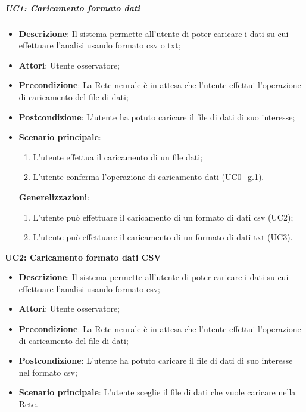 \subparagraph{UC1: Caricamento formato dati}\mbox{}
\label{UC1: Caricamento formato dati}
\noindent
\begin{itemize}
\item \textbf{Descrizione}: Il sistema permette all'utente di poter caricare i dati su cui effettuare l'analisi usando formato csv o txt;
\item \textbf{Attori}: Utente osservatore;
\item \textbf{Precondizione}: La Rete neurale \`e in attesa che l'utente effettui l'operazione di caricamento del file di dati;
\item \textbf{Postcondizione}: L'utente ha potuto caricare il file di dati di suo interesse;
\item \textbf{Scenario principale}:
\begin{enumerate}
\item L'utente effettua il caricamento di un file dati;
\item L'utente conferma l'operazione di caricamento dati (UC0\_g.1).
\end{enumerate}
\textbf{Generelizzazioni}:
\begin{enumerate}
\item L'utente pu\`o effettuare il caricamento di un formato di dati csv (UC2);
\item L'utente pu\`o effettuare il caricamento di un formato di dati txt (UC3).
\end{enumerate}
\end{itemize}


\textbf{UC2: Caricamento formato dati CSV}\mbox{}
\label{UC2: Caricamento formato dati CSV}
\begin{itemize}
\item \textbf{Descrizione}: Il sistema permette all'utente di poter caricare i dati su cui effettuare l'analisi usando formato csv;
\item \textbf{Attori}: Utente osservatore;
\item \textbf{Precondizione}: La Rete neurale \`e in attesa che l'utente effettui l'operazione di caricamento del file di dati;
\item \textbf{Postcondizione}: L'utente ha potuto caricare il file di dati di suo interesse nel formato csv;
\item \textbf{Scenario principale}: L'utente sceglie il file di dati che vuole caricare nella Rete.
\end{itemize}


